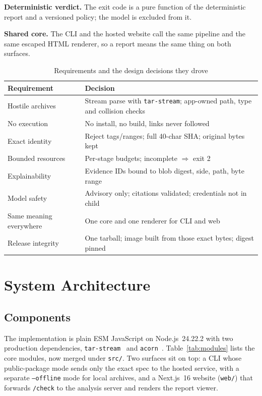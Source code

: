 \documentclass[conference]{IEEEtran}
\newcommand{\code}[1]{\texttt{#1}}
\begin{document}
\textbf{Deterministic verdict.} The exit code is a pure function of the
deterministic report and a versioned policy; the model is excluded from it.

\textbf{Shared core.} The CLI and the hosted website call the same pipeline and
the same escaped HTML renderer, so a report means the same thing on both
surfaces.

\begin{table}[t]
\caption{Requirements and the design decisions they drove}
\label{tab:decisions}
\centering
\footnotesize
\begin{tabular}{@{}p{2.6cm}p{5.0cm}@{}}
\toprule
\textbf{Requirement} & \textbf{Decision}\\
\midrule
Hostile archives & Stream parse with \code{tar-stream}; app-owned path, type and collision checks\\
No execution & No install, no build, links never followed\\
Exact identity & Reject tags/ranges; full 40-char SHA; original bytes kept\\
Bounded resources & Per-stage budgets; incomplete $\Rightarrow$ exit 2\\
Explainability & Evidence IDs bound to blob digest, side, path, byte range\\
Model safety & Advisory only; citations validated; credentials not in child\\
Same meaning everywhere & One core and one renderer for CLI and web\\
Release integrity & One tarball; image built from those exact bytes; digest pinned\\
\bottomrule
\end{tabular}
\end{table}

\section{System Architecture}\label{sec:arch}

\subsection{Components}
The implementation is plain ESM JavaScript on Node.js~24.22.2 with two
production dependencies, \code{tar-stream}~\cite{tarstream} and
\code{acorn}~\cite{acorn}. Table~\ref{tab:modules} lists the core modules, now
merged under \code{src/}. Two surfaces sit on top: a CLI whose public-package
mode sends only the exact spec to the hosted service, with a separate
\code{--offline} mode for local archives, and a Next.js~16 website
(\code{web/}) that forwards \code{/check} to the analysis server and renders the
report viewer.
\end{document}
